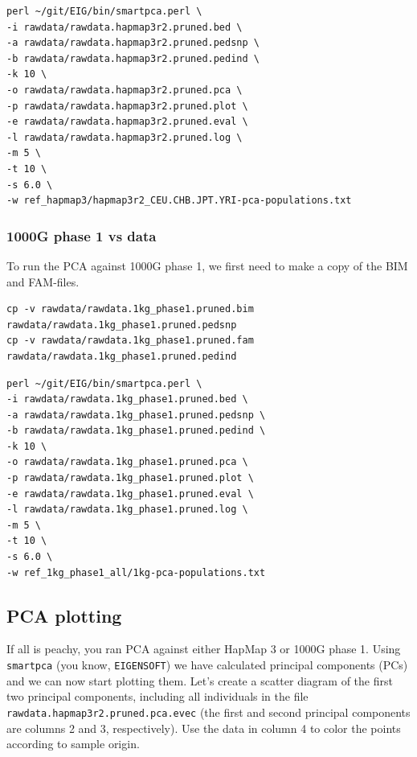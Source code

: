 \documentclass[
]{book}
\newcommand{\passthrough}[1]{#1}
\begin{document}
\begin{lstlisting}
perl ~/git/EIG/bin/smartpca.perl \
-i rawdata/rawdata.hapmap3r2.pruned.bed \
-a rawdata/rawdata.hapmap3r2.pruned.pedsnp \
-b rawdata/rawdata.hapmap3r2.pruned.pedind \
-k 10 \
-o rawdata/rawdata.hapmap3r2.pruned.pca \
-p rawdata/rawdata.hapmap3r2.pruned.plot \
-e rawdata/rawdata.hapmap3r2.pruned.eval \
-l rawdata/rawdata.hapmap3r2.pruned.log \
-m 5 \
-t 10 \
-s 6.0 \
-w ref_hapmap3/hapmap3r2_CEU.CHB.JPT.YRI-pca-populations.txt
\end{lstlisting}

\hypertarget{g-phase-1-vs-data}{%
\subsubsection{1000G phase 1 vs data}\label{g-phase-1-vs-data}}

To run the PCA against 1000G phase 1, we first need to make a copy of the BIM and FAM-files.

\begin{lstlisting}
cp -v rawdata/rawdata.1kg_phase1.pruned.bim rawdata/rawdata.1kg_phase1.pruned.pedsnp
cp -v rawdata/rawdata.1kg_phase1.pruned.fam rawdata/rawdata.1kg_phase1.pruned.pedind
\end{lstlisting}

\begin{lstlisting}
perl ~/git/EIG/bin/smartpca.perl \
-i rawdata/rawdata.1kg_phase1.pruned.bed \
-a rawdata/rawdata.1kg_phase1.pruned.pedsnp \
-b rawdata/rawdata.1kg_phase1.pruned.pedind \
-k 10 \
-o rawdata/rawdata.1kg_phase1.pruned.pca \
-p rawdata/rawdata.1kg_phase1.pruned.plot \
-e rawdata/rawdata.1kg_phase1.pruned.eval \
-l rawdata/rawdata.1kg_phase1.pruned.log \
-m 5 \
-t 10 \
-s 6.0 \
-w ref_1kg_phase1_all/1kg-pca-populations.txt
\end{lstlisting}

\hypertarget{pca-plotting}{%
\subsection{PCA plotting}\label{pca-plotting}}

If all is peachy, you ran PCA against either HapMap 3 or 1000G phase 1. Using \passthrough{\lstinline!smartpca!} (you know, \passthrough{\lstinline!EIGENSOFT!}) we have calculated principal components (PCs) and we can now start plotting them. Let's create a scatter diagram of the first two principal components, including all individuals in the file \passthrough{\lstinline!rawdata.hapmap3r2.pruned.pca.evec!} (the first and second principal components are columns 2 and 3, respectively). Use the data in column 4 to color the points according to sample origin.
\end{document}
